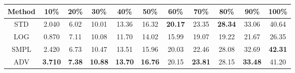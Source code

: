 \documentclass{standalone}
\begin{document}
\begin{tabular}{c|cccccccccc}
      \toprule
      Method & 10\% & 20\% & 30\% & 40\% & 50\% & 60\% & 70\% & 80\% & 90\% & 100\% \\
      \midrule
STD & 2.040 & 6.02 & 10.01 & 13.36 & 16.32 & \textbf{20.17} & 23.35 & \textbf{28.34} & 33.06 & 40.64\\
LOG & 0.870 & 7.11 & 10.08 & 11.70 & 14.02 & 15.99 & 19.07 & 19.22 & 21.67 & 26.35\\
SMPL & 2.420 & 6.73 & 10.47 & 13.51 & 15.96 & 20.03 & 22.46 & 28.08 & 32.69 & \textbf{42.31}\\
ADV & \textbf{3.710} & \textbf{7.38} & \textbf{10.88} & \textbf{13.70} & \textbf{16.76} & 20.15 & \textbf{23.81} & 28.15 & \textbf{33.48} & 41.20\\
  \bottomrule
\end{tabular}
\end{document}
